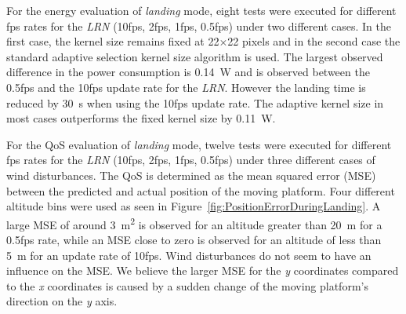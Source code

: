 \documentclass[conference]{IEEEtran}
\begin{document}
For the energy evaluation of \emph{landing} mode, eight tests were executed for different 
fps rates for the \emph{LRN}
(10fps, 2fps, 1fps, 0.5fps) under two different cases. 
In the first case, the kernel size remains fixed at 
\SI{22}{}$\times$\SI{22}{} pixels and in the second case the standard adaptive selection 
kernel size algorithm is used. 
%
The largest observed difference in the
power consumption is \SI{0.14}{\watt} and is observed between the 0.5fps and
the 10fps update rate for the \emph{LRN}.
However
the landing time is reduced by \SI{30}{\second} when using the 10fps update
rate. The adaptive kernel size in most cases outperforms the fixed
kernel size by \SI{0.11}{\watt}. 

For the QoS evaluation of \emph{landing} mode, twelve tests were executed for different 
fps rates for the \emph{LRN}
(10fps, 2fps, 1fps, 0.5fps) under three different cases of wind
disturbances. The QoS is determined as the  mean squared error (MSE) 
between the predicted and actual position of the moving platform.
Four different altitude bins were used as seen in 
Figure~\ref{fig:PositionErrorDuringLanding}. 
A large MSE of around \SI{3}{\square\meter} is observed for an altitude 
greater than \SI{20}{\meter} for a 0.5fps rate, while an MSE close to 
zero is observed for an altitude of less than \SI{5}{\meter} for an 
update rate of 10fps.  Wind disturbances do not seem to 
have an influence on the MSE. We believe the larger MSE for the \emph{y} 
coordinates compared to the \emph{x} coordinates is caused by a 
sudden change of the moving platform's direction on the \emph{y} axis.

  
\end{document}
